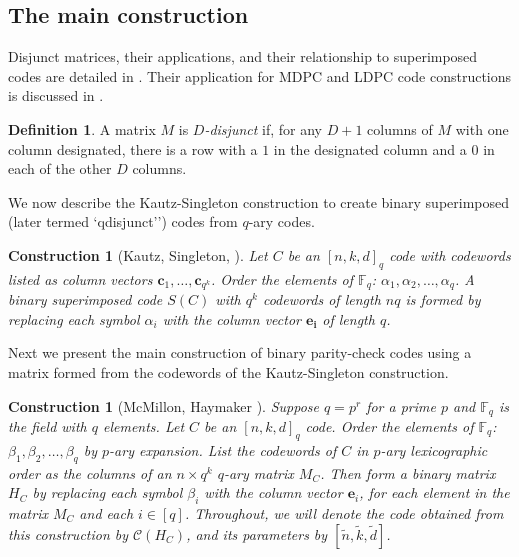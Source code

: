 \documentclass[11pt]{amsart}
\newtheorem{construction}{Construction}
\newtheorem*{construction*}{Construction}
\theoremstyle{definition}
\newtheorem{definition}[theorem]{Definition}
\newcommand{\0}{\mathbf{0}}
\newcommand{\F}{\mathbb{F}}
\begin{document}
\subsection{The main construction}
Disjunct matrices, their applications, and their relationship to superimposed codes are detailed in \cite{du2000combinatorial}. Their application for MDPC and LDPC code constructions is discussed in \cite{haymaker2025parity}.  
\begin{definition} \label{def:disjunct}
    A matrix $M$ is \textit{$D$-disjunct} if, for any $D+1$ columns of $M$ with one column designated, there is a row with a $1$ in the designated column and a $0$ in each of the other $D$ columns.
\end{definition}

We now describe the Kautz-Singleton construction to create binary superimposed (later termed `qdisjunct'') codes from $q$-ary codes.

\begin{construction*}[Kautz, Singleton, \cite{kautz1964nonrandom}] \label{construction:KS}
Let $C$ be an $[n, k, d]_q$ code with codewords listed as column vectors $\textbf{c}_1,\ldots, \textbf{c}_{q^k}$. Order the elements of $\mathbb{F}_q$: $\alpha_1, \alpha_2, \ldots, \alpha_q$. A binary superimposed code $S(C)$ with $q^k$ codewords of length $nq$ 
is formed by replacing each symbol $\alpha_i$ with the column vector $\mathbf{e_i}$ of length $q$.
\end{construction*}


Next we present the main construction of binary parity-check codes using a matrix formed from the codewords of the Kautz-Singleton construction. 

\begin{construction}[McMillon, Haymaker \cite{haymaker2025parity}]\label{construction:MH}
    Suppose $q=p^r$ for a prime $p$ and $\F_q$ is the field with $q$ elements. Let $C$ be an $[n, k, d]_q$ code. Order the elements of $\mathbb{F}_q$: $\beta_1, \beta_2, \ldots, \beta_q$ by $p$-ary expansion.  List the codewords of $C$ in $p$-ary lexicographic order as the columns of an $n\times q^k$ $q$-ary matrix $M_C$. Then form a binary matrix $H_C$ by 
    replacing each symbol $\beta_i$ with the column vector $\mathbf{e}_i$, for each element in the matrix $M_C$ and each $i \in [q]$. Throughout, we will denote the code obtained from this construction by $\mathcal{C}(H_C)$, and its parameters by $[\tilde{n}, \tilde{k}, \tilde{d}]$.
\end{construction}
\end{document}
